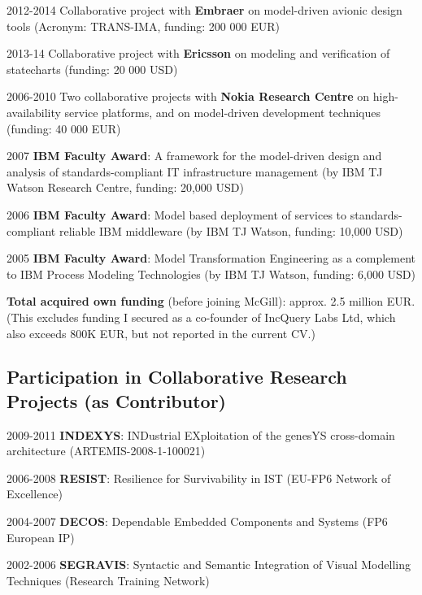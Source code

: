 \begin{yearlist}
\item[2012-2014] Collaborative project with \textbf{Embraer} on model-driven avionic design tools (Acronym: TRANS-IMA, funding: 200 000 EUR) 
\item[2013-14] Collaborative project with \textbf{Ericsson} on modeling and verification of statecharts (funding: 20 000 USD)
\item[2006-2010] Two collaborative projects with \textbf{Nokia Research Centre}
on high-availability service platforms, and on model-driven development techniques (funding: 40 000 EUR)
\item[2007] \textbf{IBM Faculty Award}: A framework for the model-driven design and analysis of standards-compliant IT infrastructure management (by IBM TJ Watson Research Centre, funding: 20,000 USD)  
\item[2006] \textbf{IBM Faculty Award}: Model based deployment of services to standards-compliant reliable IBM middleware (by IBM TJ Watson, funding: 10,000 USD) 
\item[2005] \textbf{IBM Faculty Award}: Model Transformation Engineering as a complement to IBM Process Modeling Technologies (by IBM TJ Watson, funding: 6,000 USD)  
\end{yearlist}



\textbf{Total acquired own funding} (before joining McGill): approx. 2.5 million EUR. \\
(This excludes funding I secured as a co-founder of IncQuery Labs Ltd, which also exceeds 800K EUR, but not reported in the current CV.)



\subsection{Participation in Collaborative Research Projects (as Contributor)}
\begin{yearlist}
\item[2009-2011] \textbf{INDEXYS}: INDustrial EXploitation of the genesYS cross-domain architecture (ARTEMIS-2008-1-100021) 
\item[2006-2008] \textbf{RESIST}: Resilience for Survivability in IST (EU-FP6 Network of Excellence)  
\item[2004-2007] \textbf{DECOS}: Dependable Embedded Components and Systems (FP6 European IP) 
\item[2002-2006] \textbf{SEGRAVIS}: Syntactic and Semantic Integration of
Visual Modelling Techniques (Research Training Network) 
\end{yearlist}

